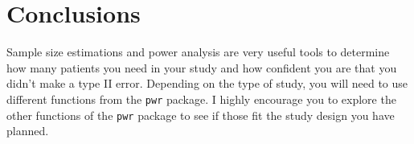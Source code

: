 \documentclass[
]{book}
\begin{document}
\hypertarget{conclusions}{%
\section{Conclusions}\label{conclusions}}

Sample size estimations and power analysis are very useful tools to determine how many patients you need in your study and how confident you are that you didn't make a type II error. Depending on the type of study, you will need to use different functions from the \texttt{pwr} package. I highly encourage you to explore the other functions of the \texttt{pwr} package to see if those fit the study design you have planned.

  
\end{document}
